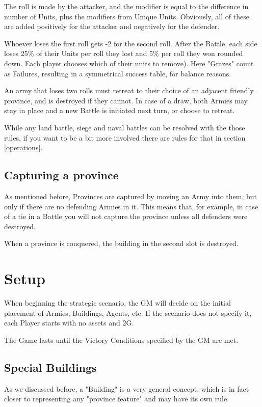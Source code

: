 The roll is made by the attacker, and the modifier is equal to the difference in number of Units, plus the modifiers from Unique Units. Obviously, all of these are added positively for the attacker and negatively for the defender.

Whoever loses the first roll gets -2 for the second roll. After the Battle, each side loses 25\% of their Units per roll they lost and 5\% per roll they won rounded down. Each player chooses which of their units to remove). Here "Grazes" count as Failures, resulting in a symmetrical success table, for balance reasons.

An army that loses two rolls must retreat to their choice of an adjacent friendly province, and is destroyed if they cannot. In case of a draw, both Armies may stay in place and a new Battle is initiated next turn, or choose to retreat.

While any land battle, siege and naval battles can be resolved with the those rules, if you want to be a bit more involved there are rules for that in section \ref{operations}.


\subsection{Capturing a province} 

As mentioned before, Provinces are captured by moving an Army into them, but only if there are no defending Armies in it. This means that, for example, in case of a tie in a Battle you will not capture the province unless all defenders were destroyed.

When a province is conquered, the building in the second slot is destroyed.


\section{Setup}

When beginning the strategic scenario, the GM will decide on the initial placement of Armies, Buildings, Agents, etc. If the scenario does not specify it, each Player starts with no assets and 2G.

The Game lasts until the Victory Conditions specified by the GM are met.


\subsection{Special Buildings} 

As we discussed before, a "Building" is a very general concept, which is in fact closer to representing any "province feature" and may have its own rule.

